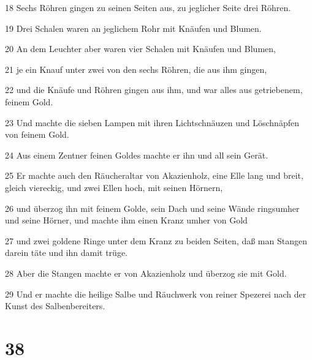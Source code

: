 \par 18 Sechs Röhren gingen zu seinen Seiten aus, zu jeglicher Seite drei Röhren.
\par 19 Drei Schalen waren an jeglichem Rohr mit Knäufen und Blumen.
\par 20 An dem Leuchter aber waren vier Schalen mit Knäufen und Blumen,
\par 21 je ein Knauf unter zwei von den sechs Röhren, die aus ihm gingen,
\par 22 und die Knäufe und Röhren gingen aus ihm, und war alles aus getriebenem, feinem Gold.
\par 23 Und machte die sieben Lampen mit ihren Lichtschnäuzen und Löschnäpfen von feinem Gold.
\par 24 Aus einem Zentner feinen Goldes machte er ihn und all sein Gerät.
\par 25 Er machte auch den Räucheraltar von Akazienholz, eine Elle lang und breit, gleich viereckig, und zwei Ellen hoch, mit seinen Hörnern,
\par 26 und überzog ihn mit feinem Golde, sein Dach und seine Wände ringsumher und seine Hörner, und machte ihm einen Kranz umher von Gold
\par 27 und zwei goldene Ringe unter dem Kranz zu beiden Seiten, daß man Stangen darein täte und ihn damit trüge.
\par 28 Aber die Stangen machte er von Akazienholz und überzog sie mit Gold.
\par 29 Und er machte die heilige Salbe und Räuchwerk von reiner Spezerei nach der Kunst des Salbenbereiters.

\chapter{38}

